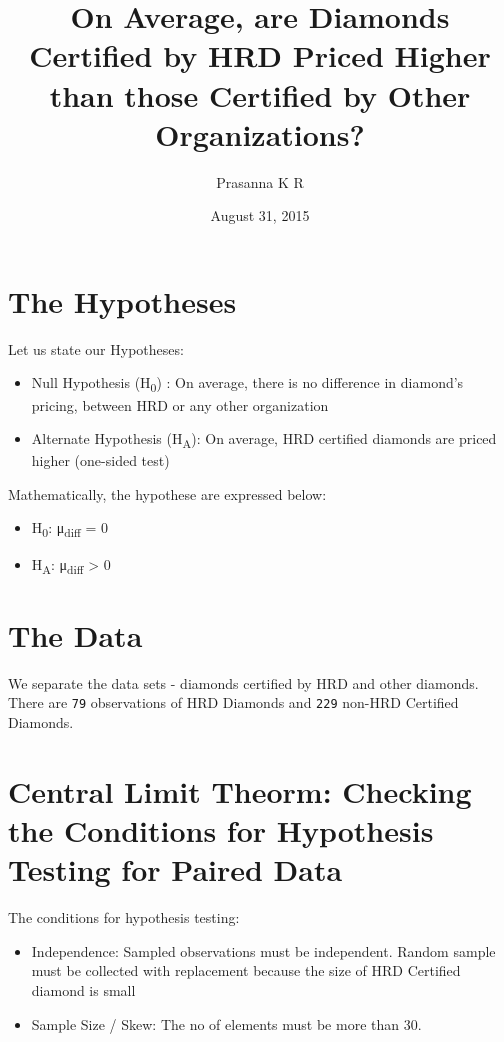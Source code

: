 \documentclass[]{article}
\title{On Average, are Diamonds Certified by HRD Priced Higher than those
Certified by Other Organizations?}
\author{Prasanna K R}
\date{August 31, 2015}
\begin{document}
\maketitle


\section{The Hypotheses}\label{the-hypotheses}

Let us state our Hypotheses:

\begin{itemize}
\itemsep1pt\parskip0pt
\item
  Null Hypothesis (H\textsubscript{0}) : On average, there is no
  difference in diamond's pricing, between HRD or any other organization
\item
  Alternate Hypothesis (H\textsubscript{A}): On average, HRD certified
  diamonds are priced higher (one-sided test)
\end{itemize}

Mathematically, the hypothese are expressed below:

\begin{itemize}
\itemsep1pt\parskip0pt
\item
  H\textsubscript{0}: μ\textsubscript{diff} = 0
\item
  H\textsubscript{A}: μ\textsubscript{diff} \textgreater{} 0
\end{itemize}

\section{The Data}\label{the-data}

We separate the data sets - diamonds certified by HRD and other
diamonds. There are \texttt{79} observations of HRD Diamonds and
\texttt{229} non-HRD Certified Diamonds.

\section{Central Limit Theorm: Checking the Conditions for Hypothesis
Testing for Paired
Data}\label{central-limit-theorm-checking-the-conditions-for-hypothesis-testing-for-paired-data}

The conditions for hypothesis testing:

\begin{itemize}
\itemsep1pt\parskip0pt
\item
  Independence: Sampled observations must be independent. Random sample
  must be collected with replacement because the size of HRD Certified
  diamond is small
\item
  Sample Size / Skew: The no of elements must be more than 30.
\end{itemize}
\end{document}

